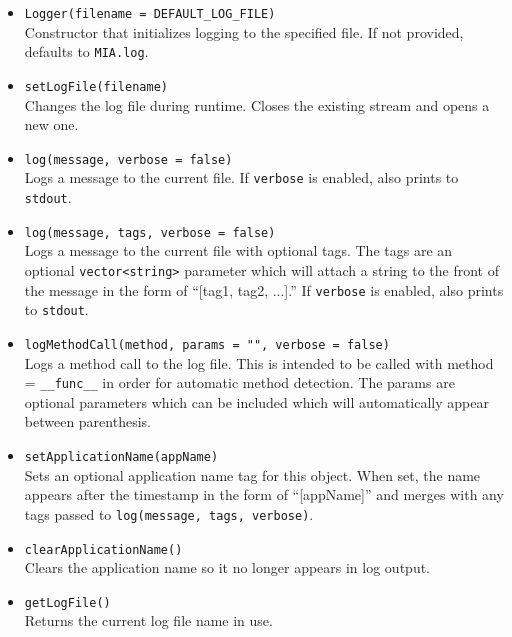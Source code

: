 \begin{itemize}\itemsep0em
	\item \texttt{Logger(filename = DEFAULT\_LOG\_FILE)}\\
	Constructor that initializes logging to the specified file. If not provided, defaults to \texttt{MIA.log}.

	\item \texttt{setLogFile(filename)}\\
	Changes the log file during runtime. Closes the existing stream and opens a new one.

	\item \texttt{log(message, verbose = false)}\\
	Logs a message to the current file. If \texttt{verbose} is enabled, also prints to \texttt{stdout}.

	\item \texttt{log(message, tags, verbose = false)}\\
	Logs a message to the current file with optional tags. The tags are an optional \texttt{vector<string>} parameter which will attach a string to the front of the message in the form of ``[tag1, tag2, ...].'' If \texttt{verbose} is enabled, also prints to \texttt{stdout}.

	\item \texttt{logMethodCall(method, params = "", verbose = false)}\\
	Logs a method call to the log file. This is intended to be called with method = \texttt{\_\_func\_\_} in order for automatic method detection. The params are optional parameters which can be included which will automatically appear between parenthesis.

	\item \texttt{setApplicationName(appName)}\\
	Sets an optional application name tag for this object. When set, the name appears after the timestamp in the form of ``[appName]'' and merges with any tags passed to \texttt{log(message, tags, verbose)}.

	\item \texttt{clearApplicationName()}\\
	Clears the application name so it no longer appears in log output.

	\item \texttt{getLogFile()}\\
	Returns the current log file name in use.
\end{itemize}

